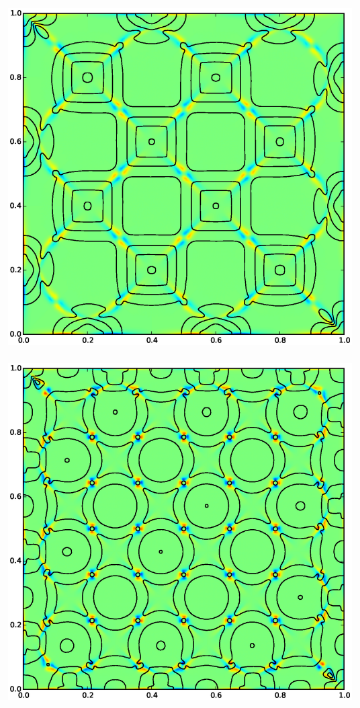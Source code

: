 \begin{figure}
\begin{subfigure}[b]{0.32\textwidth}
  \includegraphics[width=\textwidth]{figs/vorticity-25-10}
\end{subfigure}
\begin{subfigure}[b]{0.32\textwidth}
  \includegraphics[width=\textwidth]{figs/vorticity-35-10}

\end{subfigure}
\end{figure}

